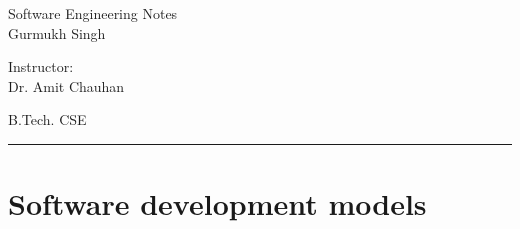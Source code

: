 \documentclass[11pt,letterpaper]{article}
\begin{document}
\begin{center}
  \Huge{Software Engineering Notes}\\
  \vspace{0.25cm}
  \small{Gurmukh Singh}
\end{center}

\vspace{-1.75cm}

\begin{flushright}
  Instructor: \\ Dr. Amit Chauhan
\end{flushright}

\vspace{-1.3cm}

\begin{flushleft}
  B.Tech. CSE
\end{flushleft}

\rule{15.5cm}{0.1mm}%

\tableofcontents
\pagebreak


\section{Software development models}
\end{document}

